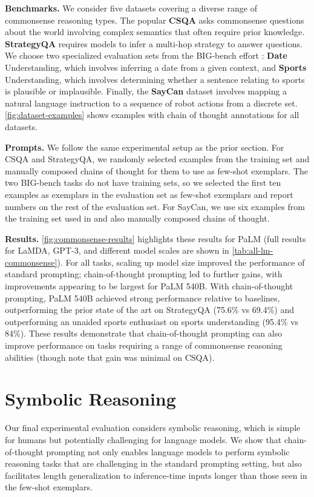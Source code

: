\textbf{Benchmarks.}
We consider five datasets covering a diverse range of commonsense reasoning types. The popular \textbf{CSQA} \citep{talmor-etal-2019-commonsenseqa} asks commonsense questions about the world involving complex semantics that often require prior knowledge.
\textbf{StrategyQA} \citep{geva-etal-2021-aristotle} requires models to infer a multi-hop strategy to answer questions. We choose two specialized evaluation sets from the BIG-bench effort \citep{bigbench}: \textbf{Date} Understanding, which involves inferring a date from a given context, and \textbf{Sports} Understanding, which involves determining whether a sentence relating to sports is plausible or implausible. Finally, the \textbf{SayCan} dataset \citep{ahn2022can} involves mapping a natural language instruction to a sequence of robot actions from a discrete set.
\ref{fig:dataset-examples} shows examples with chain of thought annotations for all datasets.

\textbf{Prompts.}
We follow the same experimental setup as the prior section. For CSQA and StrategyQA, we randomly selected examples from the training set and manually composed chains of thought for them to use as few-shot exemplars. The two BIG-bench tasks do not have training sets, so we selected the first ten examples as exemplars in the evaluation set as few-shot exemplars and report numbers on the rest of the evaluation set. For SayCan, we use six examples from the training set used in \citet{ahn2022can} and also manually composed chains of thought.

\textbf{Results.}
\ref{fig:commonsense-results} highlights these results for PaLM (full results for LaMDA, GPT-3, and different model scales are shown in \ref{tab:all-lm-commonsense}).
For all tasks, scaling up model size improved the performance of standard prompting; chain-of-thought prompting led to further gains, with improvements appearing to be largest for PaLM 540B. With chain-of-thought prompting, PaLM 540B achieved strong performance relative to baselines, outperforming the prior state of the art on StrategyQA (75.6\% vs 69.4\%) and outperforming an unaided sports enthusiast on sports understanding (95.4\% vs 84\%).
These results demonstrate that chain-of-thought prompting can also improve performance on tasks requiring a range of commonsense reasoning abilities (though note that gain was minimal on CSQA).

\section{Symbolic Reasoning}\label{sec:symbolic-reasoning}
Our final experimental evaluation considers symbolic reasoning, which is simple for humans but potentially challenging for language models. We show that chain-of-thought prompting not only enables language models to perform symbolic reasoning tasks that are challenging in the standard prompting setting, but also facilitates length generalization to inference-time inputs longer than those seen in the few-shot exemplars.

